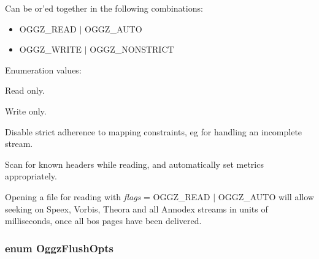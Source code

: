 Can be or'ed together in the following combinations:\begin{itemize}
\item OGGZ\_\-READ $|$ OGGZ\_\-AUTO\item OGGZ\_\-WRITE $|$ OGGZ\_\-NONSTRICT \end{itemize}
\begin{Desc}
\item[Enumeration values: ]\par
\begin{description}
\item[{\em 
OGGZ\_\-READ\label{oggz__constants_8h_a34a0}
}]Read only. \item[{\em 
OGGZ\_\-WRITE\label{oggz__constants_8h_a34a1}
}]Write only. \item[{\em 
OGGZ\_\-NONSTRICT\label{oggz__constants_8h_a34a2}
}]Disable strict adherence to mapping constraints, eg for handling an incomplete stream. \item[{\em 
OGGZ\_\-AUTO\label{oggz__constants_8h_a34a3}
}]Scan for known headers while reading, and automatically set metrics appropriately. 

Opening a file for reading with {\em flags\/} = OGGZ\_\-READ $|$ OGGZ\_\-AUTO will allow seeking on Speex, Vorbis, Theora and all Annodex streams in units of milliseconds, once all bos pages have been delivered. \end{description}
\end{Desc}

\subsubsection{\setlength{\rightskip}{0pt plus 5cm}enum {\bf Oggz\-Flush\-Opts}}\label{oggz__constants_8h_a37}


